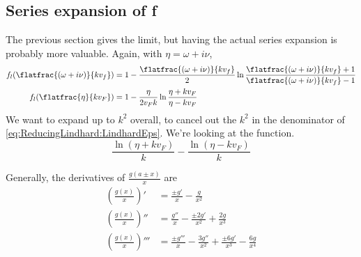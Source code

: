 \documentclass[../../main.tex]{subfiles}
\newcommand{\vf}{v_F}
\begin{document}
\subsection{Series expansion of f}
The previous section gives the limit, but having the actual series expansion is probably more valuable. Again, with $\eta = \omega + i \nu$,
\begin{align}
	f_l(\flatfrac{(\omega + i \nu)}{k v_f}) &= 1 - \frac{\flatfrac{(\omega + i \nu)}{k v_f}}{2} \ln\frac{\flatfrac{(\omega + i \nu)}{k v_f} + 1}{\flatfrac{(\omega + i \nu)}{k v_f} - 1} \\
	f_l(\flatfrac{\eta}{k \vf}) &= 1 - \frac{\eta}{2 \vf k} \ln\frac{\eta + k \vf}{\eta - k\vf} \label{eq:ReducingLindhard:simplef}
\end{align}
We want to expand up to $k^2$ overall, to cancel out the $k^2$ in the denominator of \eqref{eq:ReducingLindhard:LindhardEps}. We're looking at the function. 
\begin{equation}
	\frac{\ln(\eta + k \vf)}{k} - \frac{\ln(\eta - k \vf)}{k} 
\end{equation}

Generally, the derivatives of $\frac{g(a \pm x)}{x}$ are
\begin{align}
	\left(\frac{g(x)}{x} \right)' &= \frac{\pm g'}{x} - \frac{g}{x^2} \\
	\left(\frac{g(x)}{x} \right)'' &= \frac{g''}{x} - \frac{\pm 2g'}{x^2}+ \frac{2 g}{x^3} \\
	\left(\frac{g(x)}{x} \right)''' &= \frac{\pm g'''}{x} - \frac{  3g''}{x^2}+ \frac{\pm 6 g'}{x^3} - \frac{6 g} {x^4}
\end{align}
\end{document}
